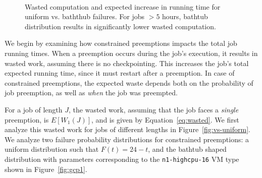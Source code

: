 \begin{figure}[t]
  \vspace*{\myfigspace}    
  \\
  \vspace*{-0.4cm}
    \vspace*{-0.4cm}
    \caption{Wasted computation and expected increase in running time for uniform vs. baththub failures. For jobs $>5$ hours, bathtub distribution results in significantly lower wasted computation.}
\vspace*{\myfigspace}    
  \label{fig:vs-uniform-both}
  
\end{figure}


We begin by examining how constrained preemptions impacts the total job running times. 
When a preemption occurs during the job's execution, it results in wasted work, assuming there is no checkpointing. 
This increases the job's total expected running time, since it must restart after a preemption.
In case of constrained preemptions, the expected waste depends both on the probability of job preemption, as well as \emph{when} the job was preempted. 


For a job of length $J$, the wasted work, assuming that the job faces a \emph{single} preemption, is $E[W_1(J)]$, and is given by Equation~\ref{eq:wasted}.
We first analyze this wasted work for jobs of different lengths in Figure~\ref{fig:vs-uniform}. 
We analyze two failure probability distributions for constrained preemptions: a uniform distribution such that $F(t) = 24-t$, and the bathtub shaped distribution with parameters corresponding to the \texttt{n1-highcpu-16} VM type shown in Figure~\ref{fig:gcp1}. 


